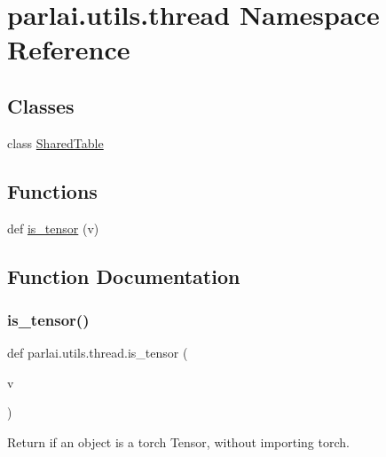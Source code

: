 \hypertarget{namespaceparlai_1_1utils_1_1thread}{}\section{parlai.\+utils.\+thread Namespace Reference}
\label{namespaceparlai_1_1utils_1_1thread}
\subsection*{Classes}
\begin{DoxyCompactItemize}
\item 
class \hyperlink{classparlai_1_1utils_1_1thread_1_1SharedTable}{Shared\+Table}
\end{DoxyCompactItemize}
\subsection*{Functions}
\begin{DoxyCompactItemize}
\item 
def \hyperlink{namespaceparlai_1_1utils_1_1thread_ad2b01da95ecdc33d8dce76a79f48137f}{is\+\_\+tensor} (v)
\end{DoxyCompactItemize}


\subsection{Function Documentation}
\mbox{\label{namespaceparlai_1_1utils_1_1thread_ad2b01da95ecdc33d8dce76a79f48137f}} 
\subsubsection{\texorpdfstring{is\+\_\+tensor()}{is\_tensor()}}
{\footnotesize\ttfamily def parlai.\+utils.\+thread.\+is\+\_\+tensor (\begin{DoxyParamCaption}\item[{}]{v }\end{DoxyParamCaption})}

\begin{DoxyVerb}Return if an object is a torch Tensor, without importing torch.
\end{DoxyVerb}
 